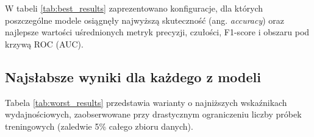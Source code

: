 \documentclass[12pt,a4paper]{article}
\begin{document}
W tabeli \ref{tab:best_results} zaprezentowano konfiguracje, dla których poszczególne modele osiągnęły najwyższą skuteczność (ang. \textit{accuracy}) oraz najlepsze wartości uśrednionych metryk precyzji, czułości, F1-score i obszaru pod krzywą ROC (AUC).

\begin{table}[H]
    \centering
    \caption{Zestawienie najlepszych wyników klasyfikacji dla badanych modeli}
    \label{tab:best_results}
\end{table}

\subsection{Najsłabsze wyniki dla każdego z modeli}

Tabela \ref{tab:worst_results} przedstawia warianty o najniższych wskaźnikach wydajnościowych, zaobserwowane przy drastycznym ograniczeniu liczby próbek treningowych (zaledwie 5\% całego zbioru danych).
\end{document}
